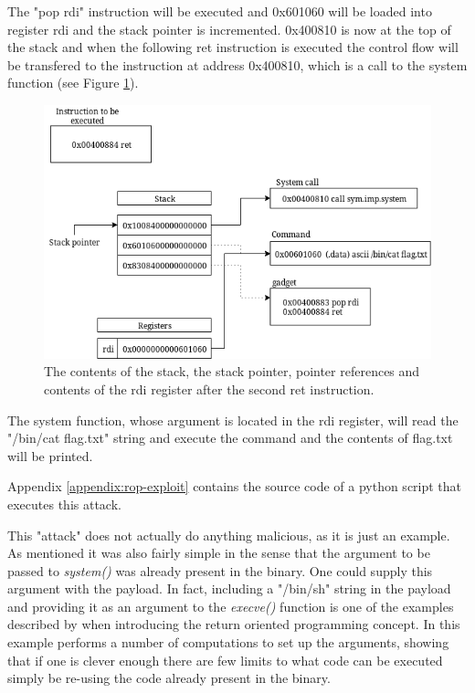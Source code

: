 The "pop rdi" instruction will be executed and 0x601060 will be loaded into register rdi
and the stack pointer is incremented. 0x400810 is now at the top of the stack and when the
following ret instruction is executed the control flow will be transfered to the
instruction at address 0x400810, which is a call to the system function (see Figure
\ref{fig:after-second}).

\begin{figure}[h]
	\centering
	\includegraphics[width=\textwidth]{background/software-diversity/figures/after-second}
	\caption{The contents of the stack, the stack pointer, pointer references and contents of the rdi register after the second ret instruction.}
	\label{fig:after-second}
\end{figure}

The system function, whose argument is located in the rdi register, will read the
"/bin/cat flag.txt" string and execute the command and the contents of flag.txt will be
printed.

Appendix \ref{appendix:rop-exploit} contains the source code of a python script that
executes this attack.

This "attack" does not actually do anything malicious, as it is just an example. As mentioned
it was also fairly simple in the sense that the argument to be passed to \textit{system()}
was already present in the binary. One could supply this argument with the payload. In
fact, including a "/bin/sh" string in the payload and providing it as an argument to the
\textit{execve()} function is one of the examples described by \textcite{rop} when
introducing the return oriented programming concept. In this example \textcite{rop} performs
a number of computations to set up the arguments, showing that if one is clever enough
there are few limits to what code can be executed simply be re-using the code already
present in the binary.

